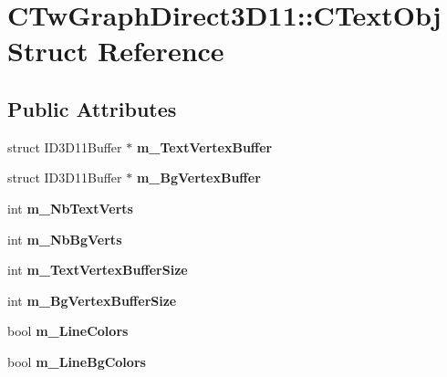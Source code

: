 \hypertarget{struct_c_tw_graph_direct3_d11_1_1_c_text_obj}{\section{C\+Tw\+Graph\+Direct3\+D11\+:\+:C\+Text\+Obj Struct Reference}
\label{struct_c_tw_graph_direct3_d11_1_1_c_text_obj}
}
\subsection*{Public Attributes}
\begin{DoxyCompactItemize}
\item 
\hypertarget{struct_c_tw_graph_direct3_d11_1_1_c_text_obj_a5740e0b46f54e280f03157a1b49b3020}{struct I\+D3\+D11\+Buffer $\ast$ {\bfseries m\+\_\+\+Text\+Vertex\+Buffer}}\label{struct_c_tw_graph_direct3_d11_1_1_c_text_obj_a5740e0b46f54e280f03157a1b49b3020}

\item 
\hypertarget{struct_c_tw_graph_direct3_d11_1_1_c_text_obj_aaaf2f6d5f2ead24c5eb59ea82a6368eb}{struct I\+D3\+D11\+Buffer $\ast$ {\bfseries m\+\_\+\+Bg\+Vertex\+Buffer}}\label{struct_c_tw_graph_direct3_d11_1_1_c_text_obj_aaaf2f6d5f2ead24c5eb59ea82a6368eb}

\item 
\hypertarget{struct_c_tw_graph_direct3_d11_1_1_c_text_obj_a95c3a9d5462a569fbc536b9812716446}{int {\bfseries m\+\_\+\+Nb\+Text\+Verts}}\label{struct_c_tw_graph_direct3_d11_1_1_c_text_obj_a95c3a9d5462a569fbc536b9812716446}

\item 
\hypertarget{struct_c_tw_graph_direct3_d11_1_1_c_text_obj_a5dd8eda9be5ec1817ce2afa92e57122c}{int {\bfseries m\+\_\+\+Nb\+Bg\+Verts}}\label{struct_c_tw_graph_direct3_d11_1_1_c_text_obj_a5dd8eda9be5ec1817ce2afa92e57122c}

\item 
\hypertarget{struct_c_tw_graph_direct3_d11_1_1_c_text_obj_af8becbfea86c513e96a6e0298ebdea4a}{int {\bfseries m\+\_\+\+Text\+Vertex\+Buffer\+Size}}\label{struct_c_tw_graph_direct3_d11_1_1_c_text_obj_af8becbfea86c513e96a6e0298ebdea4a}

\item 
\hypertarget{struct_c_tw_graph_direct3_d11_1_1_c_text_obj_a677166e0640bc076e1df777e185bffd2}{int {\bfseries m\+\_\+\+Bg\+Vertex\+Buffer\+Size}}\label{struct_c_tw_graph_direct3_d11_1_1_c_text_obj_a677166e0640bc076e1df777e185bffd2}

\item 
\hypertarget{struct_c_tw_graph_direct3_d11_1_1_c_text_obj_a0d5ea8147f4c571e3d705d44c2a099c3}{bool {\bfseries m\+\_\+\+Line\+Colors}}\label{struct_c_tw_graph_direct3_d11_1_1_c_text_obj_a0d5ea8147f4c571e3d705d44c2a099c3}

\item 
\hypertarget{struct_c_tw_graph_direct3_d11_1_1_c_text_obj_a2128999ae0533c2a635c3b9c72883d71}{bool {\bfseries m\+\_\+\+Line\+Bg\+Colors}}\label{struct_c_tw_graph_direct3_d11_1_1_c_text_obj_a2128999ae0533c2a635c3b9c72883d71}

\end{DoxyCompactItemize}


